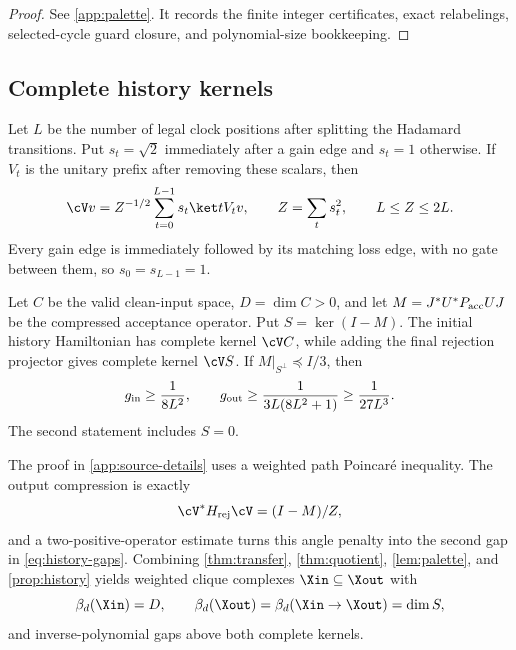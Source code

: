 \begin{proof}
See \cref{app:palette}.  It records the finite integer certificates, exact
relabelings, selected-cycle guard closure, and polynomial-size bookkeeping.
\end{proof}

\subsection{Complete history kernels}

Let \(L\) be the number of legal clock positions after splitting the
Hadamard transitions.  Put \(s_t=\sqrt2\) immediately after a gain edge and
\(s_t=1\) otherwise.  If \(V_t\) is the unitary prefix after removing these
scalars, then
\begin{equation}
\label{eq:history-isometry}
\cV v=Z^{-1/2}\sum_{t=0}^{L-1}s_t\ket tV_tv,\qquad
Z=\sum_ts_t^2,\qquad L\le Z\le2L.
\end{equation}
Every gain edge is immediately followed by its matching loss edge, with no
gate between them, so \(s_0=s_{L-1}=1\).

\begin{proposition}
\label{prop:history}
Let \(C\) be the valid clean-input space, \(D=\dim C>0\), and let
\(M=J^*U^*P_{\rm acc}UJ\) be the compressed acceptance operator.  Put
\(S=\ker(I-M)\).  The initial history Hamiltonian has complete kernel
\(\cV C\), while adding the final rejection projector gives complete kernel
\(\cV S\).  If \(M|_{S^\perp}\preceq I/3\), then
\begin{equation}
\label{eq:history-gaps}
g_{\rm in}\ge\frac1{8L^2},\qquad
g_{\rm out}\ge\frac1{3L(8L^2+1)}\ge\frac1{27L^3}.
\end{equation}
The second statement includes \(S=0\).
\end{proposition}

The proof in \cref{app:source-details} uses a weighted path Poincar\'e
inequality.  The output compression is exactly
\begin{equation}
\label{eq:output-compression}
\cV^*H_{\rm rej}\cV=(I-M)/Z,
\end{equation}
and a two-positive-operator estimate turns this angle penalty into the second
gap in \cref{eq:history-gaps}.  Combining
\cref{thm:transfer}, \cref{thm:quotient}, \cref{lem:palette}, and
\cref{prop:history} yields weighted
clique complexes \(\Xin\subseteq\Xout\) with
\begin{equation}
\label{eq:generic-circuit-transfer}
\beta_d(\Xin)=D,\qquad
\beta_d(\Xout)=\beta_d(\Xin\to\Xout)=\dim S,
\end{equation}
and inverse-polynomial gaps above both complete kernels.


